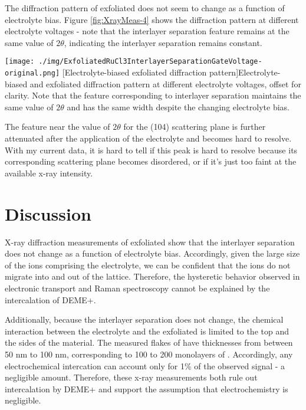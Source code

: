 The diffraction pattern of exfoliated \rucl does not seem to change as a function of electrolyte bias. Figure \ref{fig:XrayMeas-4} shows the diffraction pattern at different electrolyte voltages - note that the interlayer separation feature remains at the same value of $2\theta$, indicating the interlayer separation remains constant.

\begin{centering}
\texttt{[image: ./img/ExfoliatedRuCl3InterlayerSeparationGateVoltage-original.png]}
  \captionsetup{width=0.75\textwidth}
  [Electrolyte-biased exfoliated \rucl diffraction pattern]{Electrolyte-biased and exfoliated \rucl diffraction pattern at different electrolyte voltages, offset for clarity. Note that the feature corresponding to \rucl interlayer separation maintains the same value of $2\theta$ and has the same width despite the changing electrolyte bias.} 
  \label{fig:XrayMeas-4}
\end{centering}

The feature near the value of $2\theta$ for the (104) scattering plane is further attenuated after the application of the electrolyte and becomes hard to resolve. With my current data, it is hard to tell if this peak is hard to resolve because its corresponding scattering plane becomes disordered, or if it's just too faint at the available x-ray intensity.

\section{Discussion}

X-ray diffraction measurements of exfoliated \rucl show that the interlayer separation does not change as a function of electrolyte bias. Accordingly, given the large size of the ions comprising the electrolyte, we can be confident that the ions do not migrate into and out of the lattice. Therefore, the hysteretic behavior observed in electronic transport and Raman spectroscopy cannot be explained by the intercalation of DEME+.

Additionally, because the interlayer separation does not change, the chemical interaction between the electrolyte and the exfoliated \rucl is limited to the top and the sides of the material. The measured flakes of \rucl have thicknesses from between 50 nm to 100 nm, corresponding to 100 to 200 monolayers of \ruclnospace . Accordingly, any electrochemical intercation can account only for 1\% of the observed signal - a negligible amount. Therefore, these x-ray measurements both rule out intercalation by DEME+ and support the assumption that electrochemistry is negligible.